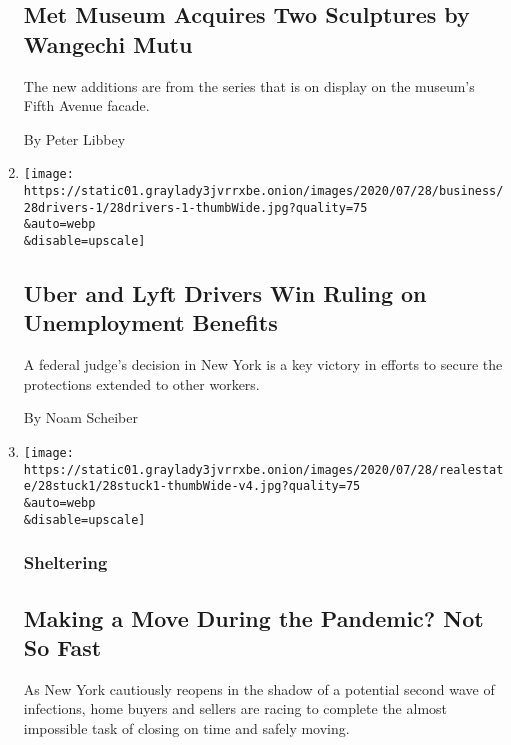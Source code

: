 \begin{enumerate}
  \hypertarget{met-museum-acquires-two-sculptures-by-wangechi-mutu}{%
  \subsection{Met Museum Acquires Two Sculptures by Wangechi
  Mutu}\label{met-museum-acquires-two-sculptures-by-wangechi-mutu}}

  The new additions are from the series that is on display on the
  museum's Fifth Avenue facade.

  By Peter Libbey
\item
  \href{/2020/07/28/business/economy/lyft-uber-drivers-unemployment.html}{}

  \texttt{[image: https://static01.graylady3jvrrxbe.onion/images/2020/07/28/business/28drivers-1/28drivers-1-thumbWide.jpg?quality=75\\\&auto=webp\\\&disable=upscale]}

  \hypertarget{uber-and-lyft-drivers-win-ruling-on-unemployment-benefits}{%
  \subsection{Uber and Lyft Drivers Win Ruling on Unemployment
  Benefits}\label{uber-and-lyft-drivers-win-ruling-on-unemployment-benefits}}

  A federal judge's decision in New York is a key victory in efforts to
  secure the protections extended to other workers.

  By Noam Scheiber
\item
  \href{/2020/07/28/realestate/buying-selling-moving-during-coronavirus.html}{}

  \texttt{[image: https://static01.graylady3jvrrxbe.onion/images/2020/07/28/realestate/28stuck1/28stuck1-thumbWide-v4.jpg?quality=75\\\&auto=webp\\\&disable=upscale]}

  \hypertarget{sheltering}{%
  \subsubsection{Sheltering}\label{sheltering}}

  \hypertarget{making-a-move-during-the-pandemic-not-so-fast}{%
  \subsection{Making a Move During the Pandemic? Not So
  Fast}\label{making-a-move-during-the-pandemic-not-so-fast}}

  As New York cautiously reopens in the shadow of a potential second
  wave of infections, home buyers and sellers are racing to complete the
  almost impossible task of closing on time and safely moving.


\end{enumerate}
